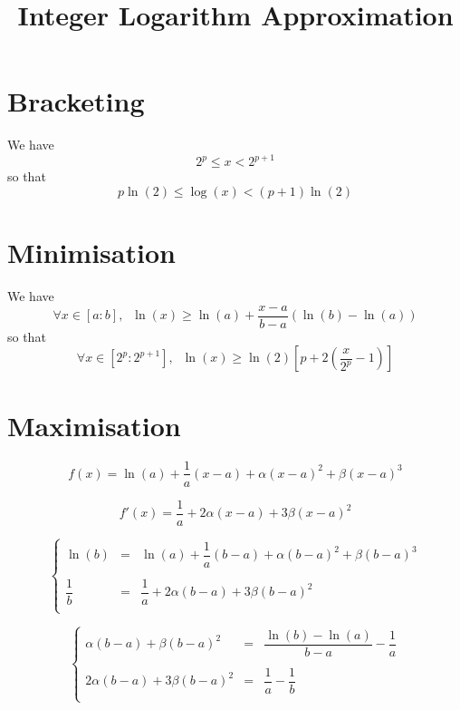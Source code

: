 \documentclass[aps]{revtex4}
\begin{document}
\title{Integer Logarithm Approximation}

\section{Bracketing}

We have 
\begin{equation}
	2^p \leq x < 2^{p+1}
\end{equation}
so that
\begin{equation}
	p\ln(2) \leq \log(x) < (p+1) \ln(2)
\end{equation}

\section{Minimisation}
We have
\begin{equation}
\forall x \in [a:b], \;\; \ln(x) \geq \ln(a) + \dfrac{x-a}{b-a} \left( \ln(b) - \ln(a) \right)
\end{equation}
so that
\begin{equation}
\forall x \in [2^p:2^{p+1}],  \;\; \ln(x) \geq \ln(2) \left[ p + 2\left( \dfrac{x}{2^p}-1 \right) \right]
\end{equation}

\section{Maximisation}

\begin{equation}
	f(x) = \ln(a) + \dfrac{1}{a}  (x-a) + \alpha (x-a)^2 + \beta (x-a)^3
\end{equation}

\begin{equation}
	 f'(x) = \dfrac{1}{a} + 2 \alpha (x-a) + 3 \beta (x-a)^2
\end{equation}

\begin{equation}
\left\lbrace
	\begin{array}{rcl}
	\ln(b) & = & \ln(a) + \dfrac{1}{a} (b-a) + \alpha (b-a)^2 + \beta (b-a)^3\\
	\\
	\dfrac{1}{b} & = & \dfrac{1}{a} + 2\alpha(b-a) + 3\beta(b-a)^2\\
	\end{array}
\right.
\end{equation}

\begin{equation}
\left\lbrace
	\begin{array}{rcl}
	\alpha (b-a) + \beta (b-a)^2 & = & \dfrac{\ln(b) - \ln(a)}{b-a} - \dfrac{1}{a}\\
	\\
	2\alpha(b-a)  + 3\beta(b-a)^2  & = & \dfrac{1}{a}-\dfrac{1}{b}  \\
	\end{array}
\right.
\end{equation}
\end{document}
